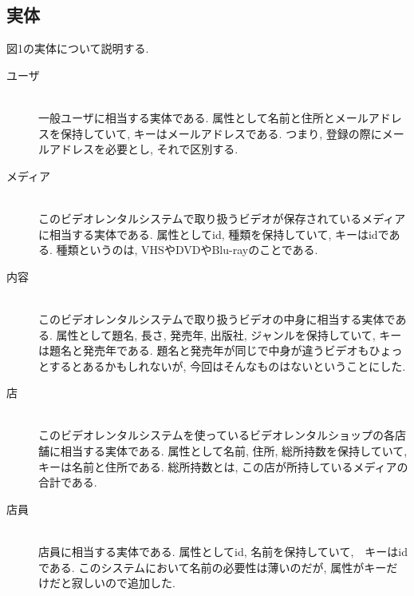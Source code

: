 \documentclass{jarticle}
\begin{document}
\subsection{実体}
図1の実体について説明する.
\begin{description}
\item[ユーザ] \leavevmode \\
一般ユーザに相当する実体である. 属性として名前と住所とメールアドレスを保持していて, キーはメールアドレスである. つまり, 登録の際にメールアドレスを必要とし, それで区別する.
\item[メディア] \leavevmode \\
このビデオレンタルシステムで取り扱うビデオが保存されているメディアに相当する実体である. 属性としてid, 種類を保持していて, キーはidである. 種類というのは, VHSやDVDやBlu-rayのことである.
\item[内容] \leavevmode \\
このビデオレンタルシステムで取り扱うビデオの中身に相当する実体である. 属性として題名, 長さ, 発売年, 出版社, ジャンルを保持していて, キーは題名と発売年である. 題名と発売年が同じで中身が違うビデオもひょっとするとあるかもしれないが, 今回はそんなものはないということにした.
\item[店] \leavevmode \\
このビデオレンタルシステムを使っているビデオレンタルショップの各店舗に相当する実体である. 属性として名前, 住所, 総所持数を保持していて, キーは名前と住所である. 総所持数とは, この店が所持しているメディアの合計である.
\item[店員] \leavevmode \\
店員に相当する実体である. 属性としてid, 名前を保持していて,　キーはidである. このシステムにおいて名前の必要性は薄いのだが, 属性がキーだけだと寂しいので追加した.
\end{description}
\end{document}

